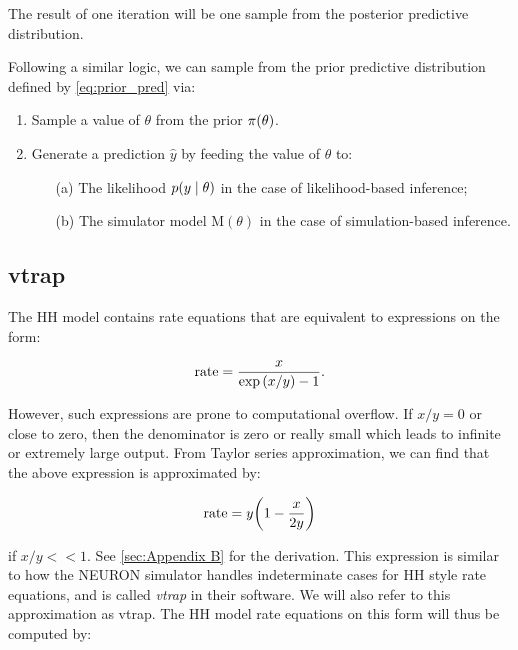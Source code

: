The result of one iteration will be one sample from the posterior predictive distribution. 

Following a similar logic, we can sample from the prior predictive distribution defined by \autoref{eq:prior_pred} via: 
\begin{enumerate}
    \item Sample a value of $\theta$ from the prior $\pi \qty(\theta)$. 
    \item Generate a prediction $\hat{y}$ by feeding the value of $\theta$ to:
    \begin{itemize}
        \item[(a)] The likelihood $p \qty(y \mid \theta)$ in the case of likelihood-based inference;
        \item[(b)] The simulator model $\mathrm{M}(\theta)$ in the case of simulation-based inference. 
    \end{itemize}
\end{enumerate}

\subsection{vtrap} 

The HH model contains rate equations that are equivalent to expressions on the form:

\begin{equation*}
    \mathrm{rate} = \frac{x}{\exp \qty(x/y) - 1}.
\end{equation*}

However, such expressions are prone to computational overflow. If $x/y = 0$ or close to zero, then the denominator is zero or really small which leads to infinite or extremely large output. From Taylor series approximation, we can find that the above expression is approximated by:

\begin{equation*}
    \mathrm{rate} = y \qty(1 - \frac{x}{2y})
\end{equation*}

if $x/y << 1$. See \autoref{sec:Appendix B} for the derivation. This expression is similar to how the NEURON simulator \cite{neuron_book} handles indeterminate cases for HH style rate equations, and is called \textit{vtrap} in their software. We will also refer to this approximation as vtrap. The HH model rate equations on this form will thus be computed by:


